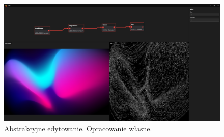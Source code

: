 \begin{figure}[H]
    \centering
    \includegraphics[width=1\linewidth]{images/Picture30.png}
    \caption{Abstrakcyjne edytowanie. Opracowanie własne.}
    \label{fig:abstract}
\end{figure} 